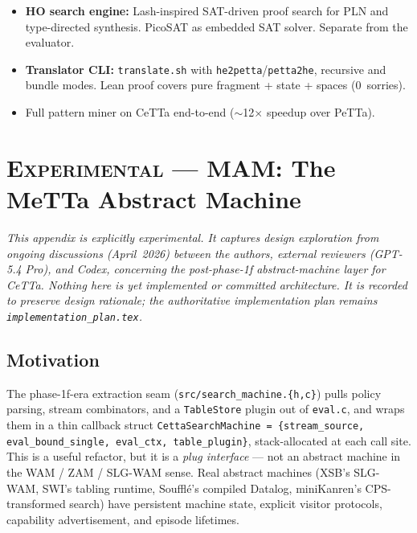 \documentclass[11pt]{article}
\newcommand{\code}[1]{\texttt{#1}}
\newcommand{\PeTTa}{\textup{PeTTa}}
\newcommand{\CeTTa}{\textup{CeTTa}}
\newcommand{\PathMap}{\textup{PathMap}}
\begin{document}
\begin{itemize}
  \PathMap{}'s zipper navigation (5{,}800 lines of Rust), product-zipper
  Cartesian joins (2{,}000 lines), and lattice operations
  (\code{pjoin}/\code{pmeet}/\code{psubtract}/\code{prestrict}, 1{,}600
  lines).  MORK's kernel already implements 15+ sink types (count, sum, head,
  hash, and, Z3, WASM) and source types (BTM, ACT, equality/inequality
  constraints).  The Lean formalization (46 files, 19K+ lines) proves the
  three-phase execution protocol, fold-level aggregation, and \PathMap{}
  lattice correspondence.  The gap is FFI exposure and MeTTa surface: the
  Rust substrate exists, \code{lib/morkl.metta} does not yet.
\item \textbf{HO search engine:} Lash-inspired SAT-driven proof
  search for PLN and type-directed synthesis.  PicoSAT as
  embedded SAT solver.  Separate from the evaluator.
\item \textbf{Translator CLI:} \code{translate.sh} with
  \code{he2petta}/\code{petta2he}, recursive and bundle modes.
  Lean proof covers pure fragment + state + spaces (0~sorries).
\item Full pattern miner on \CeTTa{} end-to-end
  ($\sim$12$\times$ speedup over \PeTTa{}).
\end{itemize}

\appendix

\section{\textsc{Experimental} --- MAM: The MeTTa Abstract Machine}
\label{app:mam}

\emph{This appendix is explicitly experimental.  It captures design
exploration from ongoing discussions (April~2026) between the authors,
external reviewers (GPT-5.4 Pro), and Codex, concerning the
post-phase-1f abstract-machine layer for \CeTTa{}.  Nothing here is yet
implemented or committed architecture.  It is recorded to preserve
design rationale; the authoritative implementation plan remains
\code{implementation\_plan.tex}.}

\subsection{Motivation}

The phase-1f-era extraction seam (\code{src/search\_machine.\{h,c\}})
pulls policy parsing, stream combinators, and a \code{TableStore}
plugin out of \code{eval.c}, and wraps them in a thin callback struct
\code{CettaSearchMachine = \{stream\_source, eval\_bound\_single,
  eval\_ctx, table\_plugin\}}, stack-allocated at each call site.
This is a useful refactor, but it is a \emph{plug interface} — not an
abstract machine in the WAM / ZAM / SLG-WAM sense.  Real abstract
machines (XSB's SLG-WAM, SWI's tabling runtime, Soufflé's compiled
Datalog, miniKanren's CPS-transformed search) have persistent machine
state, explicit visitor protocols, capability advertisement, and
episode lifetimes.
\end{document}
